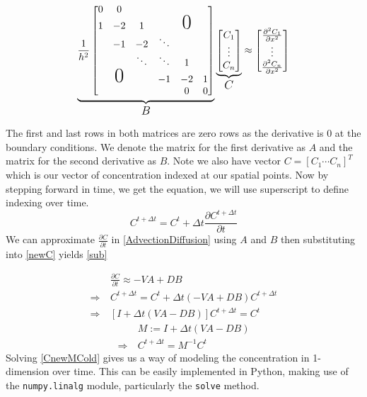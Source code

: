 \documentclass{article}
\begin{document}
\begin{equation} \label{CentralDifference2}
        \underbrace{\frac{1}{h^2}
        \begin{bmatrix}
        0 & 0 &  & & \\
        1 & -2 & 1 & &\text{\huge{$0$}} & \\
         & -1 & -2 & \ddots &\\
         & & \ddots & \ddots & 1 \\
         & \text{\huge{$0$}} & & -1 & -2 & 1 \\
         & & & & 0 & 0
        \end{bmatrix}}_\text{\large{$B$}}
        \underbrace{\begin{bmatrix}
            C_1 \\ \vdots \\ C_n
        \end{bmatrix}}_\text{\large{$C$}} \approx
        \begin{bmatrix}
            \frac{\partial^2 C_1}{\partial x^2} \\ \vdots \\ \frac{\partial^2 C_n}{\partial x^2}
        \end{bmatrix}
\end{equation}

The first and last rows in both matrices are zero rows as the derivative is 0 at the boundary conditions. We denote the matrix for the first derivative as $A$ and the matrix for the second derivative as $B$. Note we also have vector $C = [C_1 \cdots C_n]^T$ which is our vector of concentration indexed at our spatial points. Now by stepping forward in time, we get the equation, we will use superscript to define indexing over time.
\begin{equation}
    C^{t+\Delta t} = C^{t} + \Delta t \frac{\partial C^{t+\Delta t}}{\partial t}
    \label{newC}
\end{equation}
We can approximate $\frac{\partial C}{\partial t}$ in \eqref{AdvectionDiffusion} using $A$ and $B$ then substituting into \eqref{newC} yields \eqref{sub}

\begin{equation} \label{sub}
    \begin{split}
        & \frac{\partial C}{\partial t} \approx -VA + DB \\
        \Longrightarrow \ & C^{t+\Delta t} = C^{t} + \Delta t (-VA + DB) C^{t+\Delta t} \\
        \Longrightarrow \ & [I + \Delta t(VA - DB)]C^{t+\Delta t} = C^{t}
    \end{split}
\end{equation}
\begin{equation} \label{CnewMCold}
    \begin{split}
        & M := I + \Delta t(VA - DB) \\
        \Longrightarrow \ &  C^{t+\Delta t} = M^{-1} C^{t}
    \end{split}
\end{equation}
Solving \eqref{CnewMCold} gives us a way of modeling the concentration in 1-dimension over time. This can be easily implemented in Python, making use of the \verb|numpy.linalg| module, particularly the \verb|solve| method.
\end{document}
